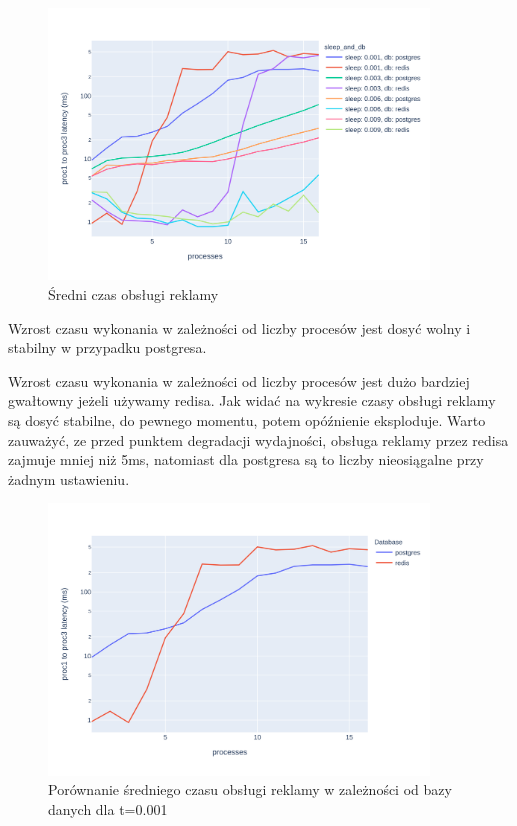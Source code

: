 \documentclass[polish, 10pt]{article}
\begin{document}

\begin{figure}[H]
    \centering
    \includegraphics[width=0.9\textwidth]{./graphs/diff_in_end_all_sleeps.png}
    \caption{Średni czas obsługi reklamy}
\end{figure}

Wzrost czasu wykonania w zależności od liczby procesów jest dosyć wolny i stabilny w przypadku postgresa.

Wzrost czasu wykonania w zależności od liczby procesów jest dużo bardziej gwałtowny jeżeli używamy redisa. Jak widać na wykresie czasy obsługi reklamy są dosyć stabilne, do pewnego momentu, potem opóźnienie eksploduje. Warto zauważyć, ze przed punktem degradacji wydajności, obsługa reklamy przez redisa zajmuje mniej niż 5ms, natomiast dla postgresa są to liczby nieosiągalne przy żadnym ustawieniu.

\begin{figure}[H]
    \centering
    \includegraphics[width=0.9\textwidth]{./graphs/diff_in_end_postgres_vs_redis0001.png}
    \caption{Porównanie średniego czasu obsługi reklamy w zależności od bazy danych dla t=0.001}
\end{figure}
\end{document}
